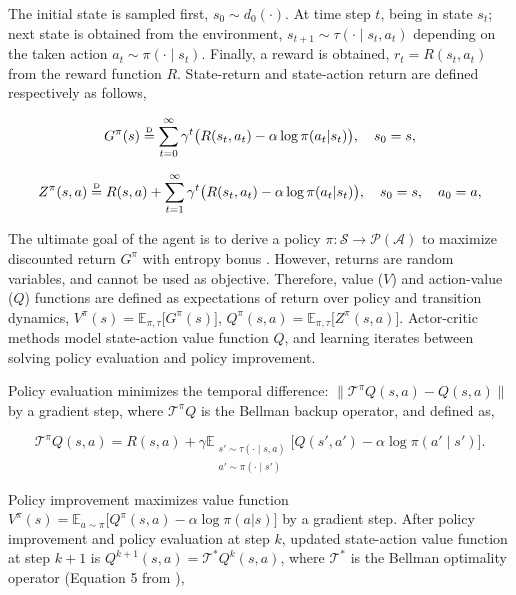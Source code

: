 \documentclass{article}
\newcommand\disteq{\mathrel{\stackrel{\makebox[0pt]{\mbox{\normalfont\tiny D}}}{=}}}
\begin{document}
The initial state is sampled first, $s_0 \sim d_0(\cdot)$. At time step $t$, being in state $s_t$; next state is obtained from the environment, $s_{t+1} \sim \tau(\cdot \mid s_t,a_t)$ depending on the taken action $a_t \sim \pi(\cdot \mid s_t)$. Finally, a reward is obtained, $r_t=R(s_t, a_t)$ from the reward function $R$. State-return and state-action return are defined respectively as follows,

\begin{equation}
	\label{eqn:value_defn}
	G^{\pi}(s) \disteq \sum_{t=0}^{\infty} \gamma^{t} \big( R(s_t, a_t) - \alpha \log \pi(a_t|s_t) \big), \quad s_0=s, 
\end{equation}

\begin{equation}
	\label{eqn:maxent_zreturn_defn}
	Z^{\pi}(s, a) \disteq R(s, a) + \sum_{t=1}^{\infty} \gamma^{t} \big( R(s_t, a_t) - \alpha \log \pi(a_t|s_t) \big) , \quad s_0=s, \quad  a_0=a,  
\end{equation}

The ultimate goal of the agent is to derive a policy $\pi: \mathcal{S} \rightarrow \mathcal{P}(\mathcal{A})$ to maximize discounted return $G^{\pi}$ with entropy bonus \citep{haarnoja2017reinforcement, haarnoja2018soft}. However, returns are random variables, and cannot be used as objective. Therefore, value ($V$) and action-value ($Q$) functions are defined as expectations of return over policy and transition dynamics, $V^{\pi}(s) = \mathbb{E}_{\pi,\tau} \big[ G^{\pi}(s) \big]$, $Q^{\pi}(s, a) = \mathbb{E}_{\pi,\tau} \big[ Z^{\pi}(s, a) \big]$. Actor-critic methods model state-action value function $Q$, and learning iterates between solving policy evaluation and policy improvement. 

Policy evaluation minimizes the temporal difference: $\big\| \mathcal{T}^{\pi} Q(s, a) - Q(s, a) \big\|$ by a gradient step, where $\mathcal{T}^{\pi} Q$ is the Bellman backup operator, and defined as, 

\begin{equation}
	\label{eqn:q_eval}
	\mathcal{T}^{\pi} Q(s,a) = R(s,a) + \gamma \mathbb{E}_{\substack{s'\sim\tau(\cdot \mid s,a) \\ a' \sim \pi(\cdot \mid s')}} \big[ Q(s',a') - \alpha \log \pi(a' \mid s') \big]. 
\end{equation}

Policy improvement maximizes value function $V^{\pi}(s)=\mathbb{E}_{a\sim\pi } \Big[ Q^{\pi}(s,a) - \alpha \log \pi(a|s) \Big]$ by a gradient step. After policy improvement and policy evaluation at step $k$, updated state-action value function at step $k+1$ is $Q^{k+1}(s,a) = \mathcal{T}^{*} Q^{k}(s,a)$, where $\mathcal{T}^{*}$ is the Bellman optimality operator (Equation 5 from \citet{haarnoja2017reinforcement}), 
\end{document}
